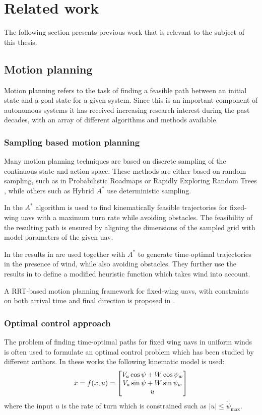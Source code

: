 \section{Related work}
The following section presents previous work that is relevant to the subject of this thesis.
\subsection{Motion planning}
Motion planning refers to the task of finding a feasible path between an initial state and a goal state for a given system. 
Since this is an important component of autonomous systems it has 
received increasing research interest during the past decades, with an array of 
different algorithms and methods available. 

\subsubsection{Sampling based motion planning}
Many motion planning techniques are based on discrete sampling of the continuous state and action space. These methods are either based on 
random sampling, such as in Probabilistic Roadmaps \cite{prm} or Rapidly Exploring Random Trees \cite{rrt}, while others such as Hybrid $A^*$ \cite{hybrid_astar} use 
deterministic sampling.

In \cite{2_phase_uav} the $A^*$ algorithm \cite{astar} is used to find kinematically feasible trajectories for fixed-wing \acp{uav} with 
a maximum turn rate while avoiding obstacles. The feasibility of the resulting path is ensured by aligning the dimensions of the 
sampled grid with model parameters of the given \ac{uav}.

In \cite{wind_astar} the results in \cite{optimal_path_trochoidal} are used together with $A^*$ to generate time-optimal trajectories in the 
presence of wind, while also avoiding obstacles. They further use the results in \cite{optimal_path_target} to define a modified heuristic function which takes wind into account.

A RRT-based motion planning framework for fixed-wing \acp{uav}, with constraints on both arrival time and final direction is proposed in \cite{rrt_uav}.

\subsubsection{Optimal control approach}
The problem of finding time-optimal paths for fixed wing \acp{uav} in uniform winds is often used to formulate an optimal control problem which has been studied
by different authors. In these works the following kinematic model is used:
\begin{equation}
    \dot{x}=f(x, u)=
    \begin{bmatrix}
        V_a\cos\psi + W\cos\psi_w\\
        V_a\sin\psi + W\sin\psi_w\\
        u    
    \end{bmatrix} 
\end{equation}
where the input $u$ is the rate of turn which is constrained such as $|u|\leq\dot{\psi}_{\text{max}}$.

